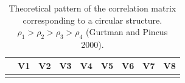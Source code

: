 \documentclass[
  default,
]{sn-jnl}
\begin{document}
\begin{longtable}[]{@{}
  >{\raggedright\arraybackslash}p{}
  >{\raggedright\arraybackslash}p{}
  >{\raggedright\arraybackslash}p{}
  >{\raggedright\arraybackslash}p{}
  >{\raggedright\arraybackslash}p{}
  >{\raggedright\arraybackslash}p{}
  >{\raggedright\arraybackslash}p{}
  >{\raggedright\arraybackslash}p{}
  >{\raggedright\arraybackslash}p{}@{}}
\caption{Theoretical pattern of the correlation matrix corresponding to
a circular structure. \(\rho_1 > \rho_2 > \rho_3 > \rho_4\) (Gurtman and
Pincus 2000).}\label{tbl-circumplex}\tabularnewline
\toprule\noalign{}
\begin{minipage}[b]{\linewidth}\raggedright
\end{minipage} & \begin{minipage}[b]{\linewidth}\raggedright
V1
\end{minipage} & \begin{minipage}[b]{\linewidth}\raggedright
V2
\end{minipage} & \begin{minipage}[b]{\linewidth}\raggedright
V3
\end{minipage} & \begin{minipage}[b]{\linewidth}\raggedright
V4
\end{minipage} & \begin{minipage}[b]{\linewidth}\raggedright
V5
\end{minipage} & \begin{minipage}[b]{\linewidth}\raggedright
V6
\end{minipage} & \begin{minipage}[b]{\linewidth}\raggedright
V7
\end{minipage} & \begin{minipage}[b]{\linewidth}\raggedright
V8
\end{minipage} \\
\midrule\noalign{}
\endfirsthead
\toprule\noalign{}
\begin{minipage}[b]{\linewidth}\raggedright
\end{minipage} & \begin{minipage}[b]{\linewidth}\raggedright

\end{minipage}
\end{longtable}
\end{document}
